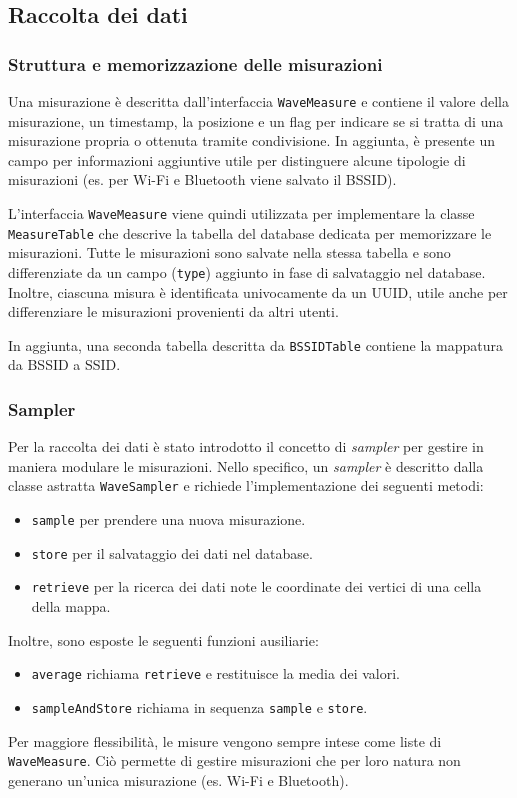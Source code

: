 \subsection{Raccolta dei dati}

\subsubsection{Struttura e memorizzazione delle misurazioni}
Una misurazione è descritta dall'interfaccia \texttt{WaveMeasure} e contiene il valore della misurazione, un timestamp, la posizione e un flag per indicare se si tratta di una misurazione propria o ottenuta tramite condivisione. 
In aggiunta, è presente un campo per informazioni aggiuntive utile per distinguere alcune tipologie di misurazioni (es. per Wi-Fi e Bluetooth viene salvato il BSSID).

L'interfaccia \texttt{WaveMeasure} viene quindi utilizzata per implementare la classe \texttt{MeasureTable} che descrive la tabella del database dedicata per memorizzare le misurazioni. 
Tutte le misurazioni sono salvate nella stessa tabella e sono differenziate da un campo (\texttt{type}) aggiunto in fase di salvataggio nel database.
Inoltre, ciascuna misura è identificata univocamente da un UUID, utile anche per differenziare le misurazioni provenienti da altri utenti.

In aggiunta, una seconda tabella descritta da \texttt{BSSIDTable} contiene la mappatura da BSSID a SSID.


\subsubsection{Sampler}
Per la raccolta dei dati è stato introdotto il concetto di \textit{sampler} per gestire in maniera modulare le misurazioni.
Nello specifico, un \textit{sampler} è descritto dalla classe astratta \texttt{WaveSampler} e richiede l'implementazione dei seguenti metodi:
\begin{itemize}
    \item \texttt{sample} per prendere una nuova misurazione.
    \item \texttt{store} per il salvataggio dei dati nel database.
    \item \texttt{retrieve} per la ricerca dei dati note le coordinate dei vertici di una cella della mappa.
\end{itemize}
Inoltre, sono esposte le seguenti funzioni ausiliarie:
\begin{itemize}
    \item \texttt{average} richiama \texttt{retrieve} e restituisce la media dei valori.
    \item \texttt{sampleAndStore} richiama in sequenza \texttt{sample} e \texttt{store}.
\end{itemize}
Per maggiore flessibilità, le misure vengono sempre intese come liste di \texttt{WaveMeasure}. Ciò permette di gestire misurazioni che per loro natura non generano un'unica misurazione (es. Wi-Fi e Bluetooth).

